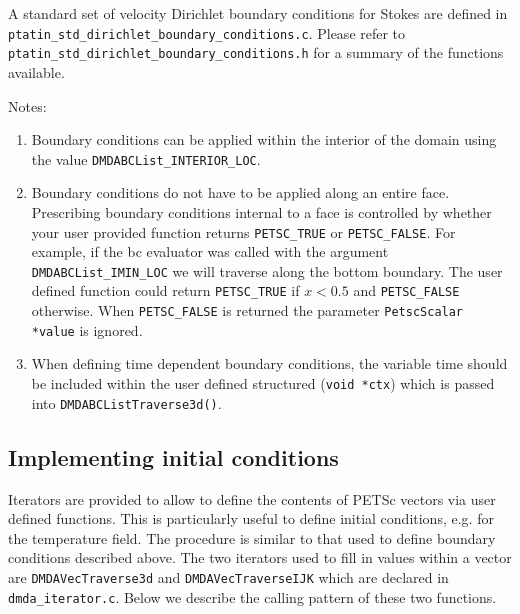 \documentclass[paper=a4, fontsize=11pt,twoside]{scrartcl}
\newcommand{\unix}[1]{\texttt{\footnotesize #1}}
\begin{document}
{{A standard set of velocity Dirichlet boundary conditions for Stokes are defined in \unix{ptatin\_std\_dirichlet\_boundary\_conditions.c}. Please refer to  \unix{ptatin\_std\_dirichlet\_boundary\_conditions.h} for a summary of the functions available.




Notes: 
\begin{enumerate}
\item Boundary conditions can be applied within the interior of the domain using the value \unix{DMDABCList\_INTERIOR\_LOC}.
\item Boundary conditions do not have to be applied along an entire face. Prescribing boundary conditions internal to a face is controlled by whether your user provided function returns  \unix{PETSC\_TRUE} or \unix{PETSC\_FALSE}. For example, if the bc evaluator was called with the argument \unix{DMDABCList\_IMIN\_LOC} we will traverse along the bottom boundary. The user defined function could return  \unix{PETSC\_TRUE} if $x < 0.5$ and \unix{PETSC\_FALSE} otherwise. When \unix{PETSC\_FALSE} is returned the parameter \unix{PetscScalar *value} is ignored.
\item When defining time dependent boundary conditions, the variable time should be included within the user defined structured (\unix{void *ctx}) which is passed into \unix{DMDABCListTraverse3d()}.
\end{enumerate}

\subsection{Implementing initial conditions}
Iterators are provided to allow to define the contents of PETSc vectors via user defined functions. This is particularly useful to define initial conditions, e.g. for the temperature field. The procedure is similar to that used to define boundary conditions described above. The two iterators used to fill in values within a vector are \unix{DMDAVecTraverse3d} and \unix{DMDAVecTraverseIJK} which are declared in \unix{dmda\_iterator.c}. Below we describe the calling pattern of these two functions.

}}
\end{document}
